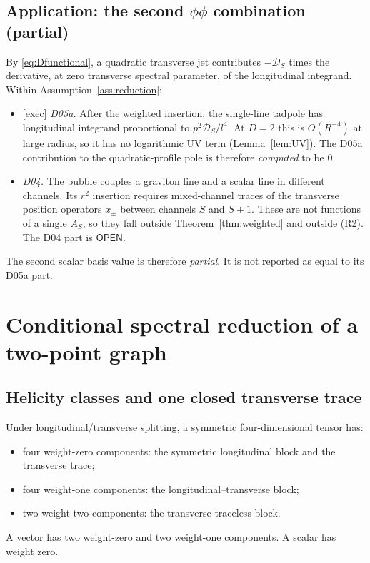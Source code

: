\documentclass[11pt,a4paper]{article}
\newcommand{\OPEN}{\textsf{OPEN}}
\theoremstyle{plain}
\theoremstyle{definition}
\theoremstyle{remark}
\numberwithin{equation}{section}
\begin{document}
\subsection{Application: the second \texorpdfstring{\(\phi\phi\)}{phi-phi} combination (partial)}

By \eqref{eq:Dfunctional}, a quadratic transverse jet contributes
\(-\mathcal D_S\) times the derivative, at zero transverse spectral
parameter, of the longitudinal integrand.
Within Assumption~\ref{ass:reduction}:
\begin{itemize}
\item \textsf{[exec]} \emph{D05a.} After the weighted insertion,
the single-line tadpole has longitudinal integrand proportional to
\(p^2\mathcal D_S/l^4\).
At \(D=2\) this is \(O(R^{-4})\) at large radius, so it has no
logarithmic UV term (Lemma~\ref{lem:UV}).
The D05a contribution to the quadratic-profile pole is therefore
\emph{computed} to be \(0\).
\item \emph{D04.} The bubble couples a graviton line and a scalar
line in different channels.
Its \(r^2\) insertion requires mixed-channel traces of the
transverse position operators \(x_\pm\) between channels \(S\) and
\(S\pm1\).
These are not functions of a single \(A_S\), so they fall outside
Theorem~\ref{thm:weighted} and outside (R2).
The D04 part is \(\OPEN\).
\end{itemize}
The second scalar basis value is therefore \emph{partial}.
It is not reported as equal to its D05a part.

\section{Conditional spectral reduction of a two-point graph}
\label{sec:reduction}

\subsection{Helicity classes and one closed transverse trace}

Under longitudinal/transverse splitting, a symmetric four-dimensional
tensor has:
\begin{itemize}
\item four weight-zero components: the symmetric longitudinal block
and the transverse trace;
\item four weight-one components: the longitudinal--transverse block;
\item two weight-two components: the transverse traceless block.
\end{itemize}
A vector has two weight-zero and two weight-one components.
A scalar has weight zero.
\end{document}
